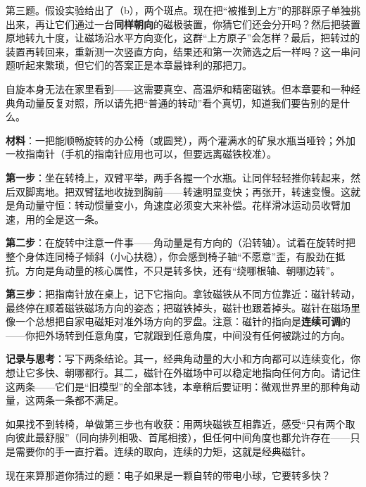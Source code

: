 第三题。假设实验给出了（b），两个斑点。现在把“被推到上方”的那群原子单独挑出来，再让它们通过一台\textbf{同样朝向}的磁极装置，你猜它们还会分开吗？然后把装置原地转九十度，让磁场沿水平方向变化，这群“上方原子”会怎样？最后，把转过的装置再转回来，重新测一次竖直方向，结果还和第一次筛选之后一样吗？这一串问题听起来繁琐，但它们的答案正是本章最锋利的那把刀。


自旋本身无法在家里看到——这需要真空、高温炉和精密磁铁。但本章要和一种经典角动量反复对照，所以请先把“普通的转动”看个真切，知道我们要告别的是什么。

\begin{experiment}
\textbf{材料}：一把能顺畅旋转的办公椅（或圆凳），两个灌满水的矿泉水瓶当哑铃；外加一枚指南针（手机的指南针应用也可以，但要远离磁铁校准）。

\textbf{第一步}：坐在转椅上，双臂平举，两手各握一个水瓶。让同伴轻轻推你转起来，然后双脚离地。把双臂猛地收拢到胸前——转速明显变快；再张开，转速变慢。这就是角动量守恒：转动惯量变小，角速度必须变大来补偿。花样滑冰运动员收臂加速，用的全是这一条。

\textbf{第二步}：在旋转中注意一件事——角动量是有方向的（沿转轴）。试着在旋转时把整个身体连同椅子倾斜（小心扶稳），你会感到椅子轴“不愿意”歪，有股劲在抵抗。方向是角动量的核心属性，不只是转多快，还有“绕哪根轴、朝哪边转”。

\textbf{第三步}：把指南针放在桌上，记下它指向。拿钕磁铁从不同方位靠近：磁针转动，最终停在顺着磁铁磁场方向的姿态；把磁铁掉头，磁针也跟着掉头。磁针在磁场里像一个总想把自家电磁矩对准外场方向的罗盘。注意：磁针的指向是\textbf{连续可调}的——你把外场转到任意角度，它就跟到任意角度，中间没有任何被跳过的方向。

\textbf{记录与思考}：写下两条结论。其一，经典角动量的大小和方向都可以连续变化，你想让它多快、朝哪都行。其二，磁针在外磁场中可以稳定地指向任何方向。请记住这两条——它们是“旧模型”的全部本钱，本章稍后要证明：微观世界里的那种角动量，这两条一条都不满足。
\end{experiment}

如果找不到转椅，单做第三步也有收获：用两块磁铁互相靠近，感受“只有两个取向彼此最舒服”（同向排列相吸、首尾相接），但任何中间角度也都允许存在——只是需要你的手一直拧着。连续的取向，连续的力矩，这就是经典磁针。


现在来算那道你猜过的题：电子如果是一颗自转的带电小球，它要转多快？

